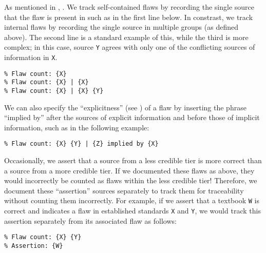As mentioned in , \oneSrcDistinct{}. We track
self-contained flaws by recording the single source that the flaw is present
in such as in the first line below. In constrast, we track internal flaws
by recording the single source in multiple groups (as defined above). The
second line is a standard example of this, while the third is more complex;
in this case, source \texttt{Y} agrees with only one of the conflicting
sources of information in \texttt{X}.
\begin{displayquote}
    \texttt{\% Flaw count: \{X\}\\\% Flaw count: \{X\} | \{X\}\\
        \% Flaw count: \{X\} | \{X\} \{Y\}}
\end{displayquote}
We can also specify the ``explicitness'' (see ) of a
flaw by inserting the phrase ``implied by'' after the sources of explicit
information and before those of implicit information, such as in the
following example:
\begin{displayquote}
    \texttt{\% Flaw count: \{X\} \{Y\} | \{Z\} implied by \{X\}}
\end{displayquote}\label{less-cred-assert}%
Occasionally, we assert that a source from a less credible tier is more
correct than a source from a more credible tier.
If we documented these flaws as above, they would incorrectly be counted as
flaws within the less credible tier! Therefore, we document these
``assertion'' sources separately to track them for traceability without
counting them incorrectly.
For example, if we assert that a textbook \texttt{W} is correct and
indicates a flaw in established standards \texttt{X} and \texttt{Y}, we
would track this assertion separately from its associated flaw as follows:
\begin{displayquote}
    \texttt{\% Flaw count: \{X\} \{Y\}\\\% Assertion: \{W\}}
\end{displayquote}
